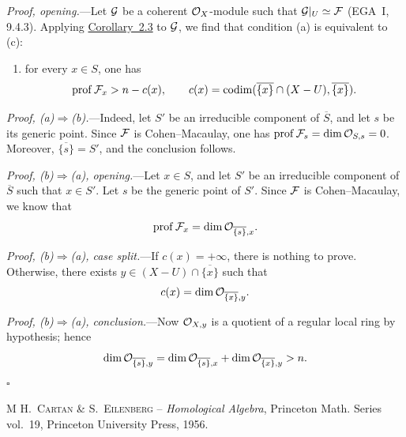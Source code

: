 \medskip
\noindent\textit{Proof, opening.}---Let $\mathcal G$ be a coherent $\mathcal O_X$-module
such that $\cG|_U\simeq\cF$ (EGA~I, 9.4.3). Applying \hyperref[VIII.2.3]{Corollary~2.3} to
$\mathcal G$, we find that condition \textup{(a)} is equivalent to \textup{(c)}:
\begin{enumerate}
\item[(c)] for every $x\in S$, one has
\[
  \prof\cF_x>n-c(x),
  \qquad
  c(x)=\codimn(\overline{\{x\}}\cap (X-U),\overline{\{x\}}).
\]
\end{enumerate}


\medskip
\noindent\textit{Proof, \textup{(a)}$\Rightarrow$\textup{(b)}.}---Indeed,
let $S'$ be an irreducible component of $\overline S$, and let $s$ be its
generic point. Since $\cF$ is Cohen--Macaulay, one has
$\prof \cF_s=\dim\cO_{S,s}=0$. Moreover, $\overline{\{s\}}=S'$, and the
conclusion follows.


\medskip
\noindent\textit{Proof, \textup{(b)}$\Rightarrow$\textup{(a)}, opening.}---Let
$x\in S$, and let $S'$ be an irreducible component of $\overline S$ such that
$x\in S'$. Let $s$ be the generic point of $S'$. Since $\cF$ is
Cohen--Macaulay, we know that
\[
  \prof \cF_x=\dim\cO_{\overline{\{s\}},x}.
\]

\medskip
\noindent\textit{Proof, \textup{(b)}$\Rightarrow$\textup{(a)}, case
split.}---If $c(x)=+\infty$, there is nothing to prove. Otherwise, there exists
$y\in (X-U)\cap\overline{\{x\}}$ such that
\[
  c(x)=\dim\mathcal O_{\overline{\{x\}},y}.
\]

\medskip
\noindent\textit{Proof, \textup{(b)}$\Rightarrow$\textup{(a)},
conclusion.}---Now $\mathcal O_{X,y}$ is a quotient of a regular local ring by
hypothesis; hence
\[
  \dim\mathcal O_{\overline{\{s\}},y}
  =\dim\mathcal O_{\overline{\{s\}},x}
   +\dim\mathcal O_{\overline{\{x\}},y}>n.
\]
\hfill$\square$


\begingroup

\renewcommand{\refname}{Bibliography}
\begin{thebibliography}{M}
\textsc{H.~Cartan \& S.~Eilenberg} -- \emph{Homological Algebra},
Princeton Math. Series vol.~19, Princeton University Press, 1956.
\end{thebibliography}
\endgroup
